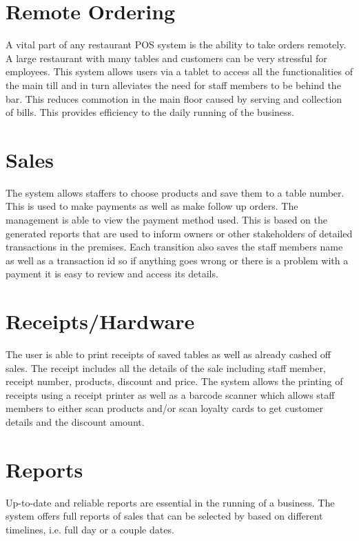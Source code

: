 \section{Remote Ordering}

A vital part of any restaurant POS system is the ability to take orders remotely. A large restaurant with many tables and customers can be very stressful for employees. This system allows users via a tablet to access all the functionalities of the main till and in turn alleviates the need for staff members to be behind the bar. This reduces commotion in the main floor caused by serving and collection of bills. This provides efficiency to the daily running of the business.

\section{Sales}

The system allows staffers to choose products and save them to a table number. This is used to make payments as well as make follow up orders. The management is able to view the payment method used. This is based on the generated reports that are used to inform owners or other stakeholders of detailed transactions in the premises. Each transition also saves the staff members name as well as a transaction id so if anything goes wrong or there is a problem with a payment it is easy to review and access its details.

\section{Receipts/Hardware}

The user is able to print receipts of saved tables as well as already cashed off sales. The receipt includes all the details of the sale including staff member, receipt number, products, discount and price.
\newline
\newline
The system allows the printing of receipts using a receipt printer as well as a barcode scanner which allows staff members to either scan products and/or scan loyalty cards to get customer details and the discount amount. 

\section{Reports} 

Up-to-date and reliable reports are essential in the running of a business. The system offers full reports of sales that can be selected by based on different timelines, i.e. full day or a couple dates.


